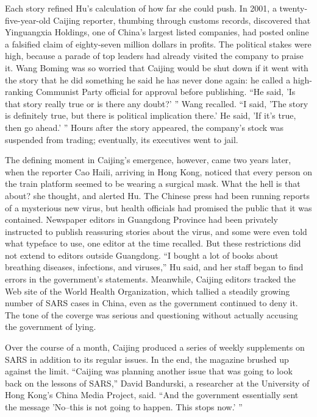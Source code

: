 ﻿\documentclass[12pt]{article}
\begin{document}
Each story refined Hu's calculation of how far she could push. In 2001, a twenty-five-year-old
Caijing reporter, thumbing through customs records, discovered that Yinguangxia Holdings, one of
China's largest listed companies, had posted online a falsified claim of eighty-seven million
dollars in profits. The political stakes were high, because a parade of top leaders had already
visited the company to praise it. Wang Boming was so worried that Caijing would be shut down if it
went with the story that he did something he said he has never done again: he called a high-ranking
Communist Party official for approval before publishing. ``He said, 'Is that story really true or is
there any doubt?' '' Wang recalled. ``I said, 'The story is definitely true, but there is political
implication there.' He said, 'If it's true, then go ahead.' '' Hours after the story appeared, the
company's stock was suspended from trading; eventually, its executives went to jail.

The defining moment in Caijing's emergence, however, came two years later, when the reporter Cao
Haili, arriving in Hong Kong, noticed that every person on the train platform seemed to be wearing a
surgical mask. What the hell is that about? she thought, and alerted Hu. The Chinese press had been
running reports of a mysterious new virus, but health officials had promised the public that it was
contained. Newspaper editors in Guangdong Province had been privately instructed to publish
reassuring stories about the virus, and some were even told what typeface to use, one editor at the
time recalled. But these restrictions did not extend to editors outside Guangdong. ``I bought a lot
of books about breathing diseases, infections, and viruses,'' Hu said, and her staff began to find
errors in the government's statements. Meanwhile, Caijing editors tracked the Web site of the World
Health Organization, which tallied a steadily growing number of SARS cases in China, even as the
government continued to deny it. The tone of the coverge was serious and questioning without
actually accusing the government of lying.

Over the course of a month, Caijing produced a series of weekly supplements on SARS in addition to
its regular issues. In the end, the magazine brushed up against the limit. ``Caijing was planning
another issue that was going to look back on the lessons of SARS,'' David Bandurski, a researcher at
the University of Hong Kong's China Media Project, said. ``And the government essentially sent the
message 'No--this is not going to happen. This stops now.' ''
\end{document}
